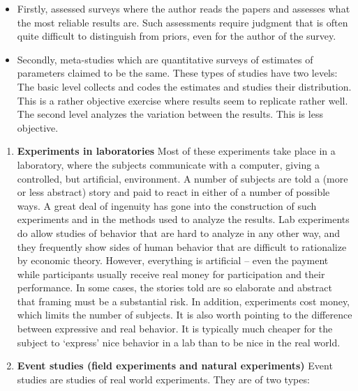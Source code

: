\documentclass[
  12pt,
  oneside]{book}
\providecommand{\tightlist}{%
  \setlength{\itemsep}{0pt}\setlength{\parskip}{0pt}}
\theoremstyle{definition}
\theoremstyle{definition}
\theoremstyle{definition}
\theoremstyle{definition}
\theoremstyle{remark}
\begin{document}
\begin{itemize}
\tightlist
\item
  Firstly, assessed surveys where the author reads the papers and assesses what the most reliable results are. Such assessments require judgment that is often quite difficult to distinguish from priors, even for the author of the survey.
\item
  Secondly, meta-studies which are quantitative surveys of estimates of parameters claimed to be the same. These types of studies have two levels: The basic level collects and codes the estimates and studies their distribution. This is a rather objective exercise where results seem to replicate rather well. The second level analyzes the variation between the results. This is less objective.
\end{itemize}

\begin{enumerate}
\def\labelenumi{\arabic{enumi}.}
\setcounter{enumi}{3}
\item
  \textbf{Experiments in laboratories} Most of these experiments take place in a laboratory, where the subjects communicate with a computer, giving a controlled, but artificial, environment. A number of subjects are told a (more or less abstract) story and paid to react in either of a number of possible ways. A great deal of ingenuity has gone into the construction of such experiments and in the methods used to analyze the results. Lab experiments do allow studies of behavior that are hard to analyze in any other way, and they frequently show sides of human behavior that are difficult to rationalize by economic theory. However, everything is artificial -- even the payment while participants usually receive real money for participation and their performance. In some cases, the stories told are so elaborate and abstract that framing must be a substantial risk. In addition, experiments cost money, which limits the number of subjects. It is also worth pointing to the difference between expressive and real behavior. It is typically much cheaper for the subject to `express' nice behavior in a lab than to be nice in the real world.
\item
  \textbf{Event studies (field experiments and natural experiments)} Event studies are studies of real world experiments. They are of two types:
\end{enumerate}
\end{document}
